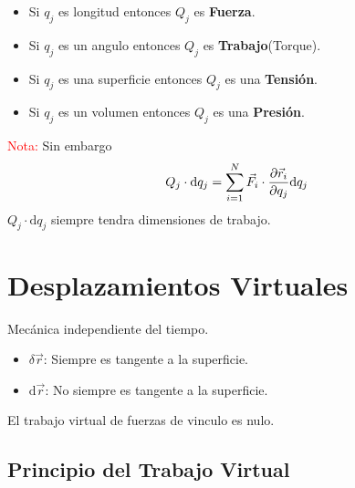 \documentclass[../main]{subfiles}
\begin{document}
\begin{itemize}
    \item Si $q_j$ es longitud entonces $Q_j$ es \textbf{Fuerza}.
    \item Si $q_j$ es un angulo entonces $Q_j$ es \textbf{Trabajo}(Torque).
    \item Si $q_j$ es una superficie entonces $Q_j$ es una \textbf{Tensión}.
    \item Si $q_j$ es un volumen entonces $Q_j$ es una \textbf{Presión}.
\end{itemize}

\textcolor{red}{Nota:} Sin embargo
\begin{equation}
    Q_j \cdot \mathrm{d}q_j=\sum_{i=1}^N \vec{F}_i \cdot \pdv{\vec{r}_i}{q_j}\mathrm{d}q_j
\end{equation}
$Q_j \cdot \mathrm{d}q_j$ siempre tendra dimensiones de trabajo.

\section{Desplazamientos Virtuales}\label{sec7}

Mecánica independiente del tiempo.

\begin{itemize}
    \item $\delta \vec{r}$: Siempre es tangente a la superficie.
    \item $\mathrm{d} \vec{r}$: No siempre es tangente a la superficie.
\end{itemize}
El trabajo virtual de fuerzas de vinculo es nulo.

\subsection{Principio del Trabajo Virtual}
\end{document}
